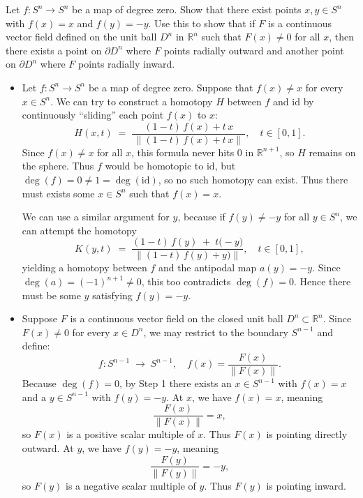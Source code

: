 \documentclass[12pt]{article}
\begin{document}
\begin{statement}[4]
  Let $f:S^n \to S^n$ be a map of degree zero. Show that there exist points $x,y \in S^n$ with $f(x)=x$ and $f(y)=-y$. Use this to 
  show that if $F$ is a continuous vector field defined on the unit ball $D^n$ in $\mathbb{R}^n$ such that $F(x) \neq 0$ 
  for all $x$, then there exists a point on $\partial D^n$ where $F$ points radially outward and another point on 
  $\partial D^n$ where $F$ points radially inward. 
\end{statement}
\begin{newproof}
    \begin{itemize}
        \item Let $f: S^n \to S^n$ be a map of degree zero. Suppose that $f(x) \neq x$ for every $x \in S^n$. We can try to construct a homotopy $H$ between $f$ and $\mathrm{id}$ by continuously ``sliding'' each point $f(x)$ to $x$:
            $$ H(x,t) \;=\; \frac{(1-t)\,f(x) + t\,x}{\,\|(1-t)\,f(x) + t\,x\|\,}, \quad t \in [0,1]. $$
            Since $f(x) \neq x$ for all $x$, this formula never hits $0$ in $\mathbb{R}^{n+1}$, so $H$ remains on the sphere. Thus $f$ would be homotopic to $\mathrm{id}$, but $\deg(f) = 0 \neq 1 = \deg(\mathrm{id})$, so no such homotopy can exist. Thus there must exists some $x \in S^n$ such that $f(x)=x$.
            \par We can use a similar argument for $y$, because if $f(y) \neq -y$ for all $y \in S^n$, we can attempt the homotopy 
            $$ K(y,t) \;=\; \frac{(1-t)\,f(y) \;+\; t\bigl(-y\bigr)}{\|(1-t)\,f(y) + y)\|}, \quad t \in [0,1], $$
            yielding a homotopy between $f$ and the antipodal map $a(y)=-y$. Since $\deg(a) = (-1)^{n+1} \neq 0$, this too contradicts $\deg(f)=0$. Hence there must be some $y$ satisfying $f(y) = -y$.
        \item Suppose $F$ is a continuous vector field on the closed unit ball $D^n \subset \mathbb{R}^n$. Since $F(x) \neq 0$ for every $x \in D^n$, we may restrict to the boundary $S^{n-1}$ and define:
        $$ f: S^{n-1} \;\longrightarrow\; S^{n-1}, \quad f(x) = \frac{F(x)}{\|F(x)\|}. $$
        Because $\deg(f) = 0$, by Step 1 there exists an $x \in S^{n-1}$ with $f(x) = x$ and a $y \in S^{n-1}$ with $f(y) = -y.$ At $x$, we have $f(x)=x$, meaning 
          $$
            \frac{F(x)}{\|F(x)\|} = x,
          $$
          so $F(x)$ is a positive scalar multiple of $x$. Thus $F(x)$ is pointing directly outward. At $y$, we have $f(y) = -y$, meaning 
          $$
            \frac{F(y)}{\|F(y)\|} = -y,
          $$
          so $F(y)$ is a negative scalar multiple of $y$. Thus $F(y)$ is pointing inward.
    \end{itemize}
\end{newproof}
\end{document}
